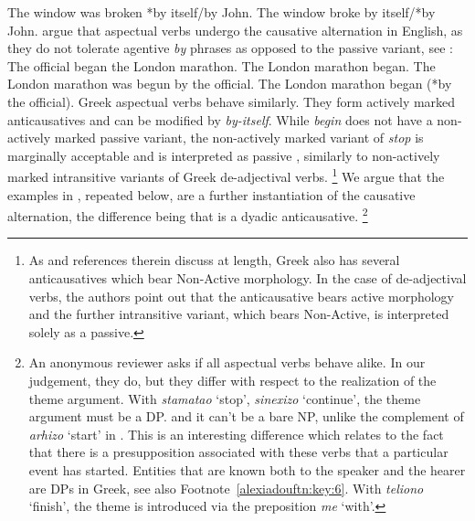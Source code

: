 \documentclass[output=paper]{langscibook}
\begin{document}
\ea%
    \label{alexiadouex:key:5}
    \ea The window was broken *by itself/by John.
    \ex The window broke by itself/*by John.
    \z 
\z 
\citet{MourounasWilliamson2019} argue that aspectual verbs undergo the causative alternation in English, 
as they do not tolerate agentive \textit{by} phrases as opposed to the passive variant, see :
\ea%
    \label{alexiadouex:key:6}
    \ea The official began the London marathon.
    \ex The London marathon began.
    \ex The London marathon was begun by the official.
    \ex The London marathon began (*by the official).
    \z 
\z
Greek aspectual verbs behave similarly. 
They form actively marked anticausatives and can be modified by \textit{by-itself}. 
While \textit{begin} does not have a non-actively marked passive variant, 
the non-actively marked variant of \textit{stop} is marginally acceptable and is interpreted as passive , 
similarly to non-actively marked intransitive variants of Greek de-adjectival verbs.%
\footnote{
    As \citet{AlexiadouAnagnostopoulouSchafer2015} and references therein discuss at length, 
    Greek also has several anticausatives which bear Non-Active morphology. 
    In the case of de-adjectival verbs, the authors point out that the anticausative bears active morphology and the further intransitive variant, 
    which bears Non-Active, is interpreted solely as a passive.
}
\ea%
    \label{alexiadouex:key:7}
    \z 
\z 
We argue that the examples in , repeated below, are a further instantiation of the causative alternation, 
the difference being that  is a dyadic anticausative.%
\footnote{
    An anonymous reviewer asks if all aspectual verbs behave alike. 
    In our judgement, they do, but they differ with respect to the realization of the theme argument. 
    With \textit{stamatao} ‘stop’, \textit{sinexizo} `continue’, the theme argument must be a DP. 
    and it can't be a bare NP, unlike the complement of \textit{arhizo} `start' in .    
    This is an interesting difference which relates to the fact that there is a presupposition associated with these verbs that a particular event has started. 
    Entities that are known both to the speaker and the hearer are DPs in Greek, see also Footnote~\ref{alexiadouftn:key:6}. 
    With \textit{teliono} ‘finish’, the theme is introduced via  the preposition \textit{me} ‘with’.
}
\end{document}

